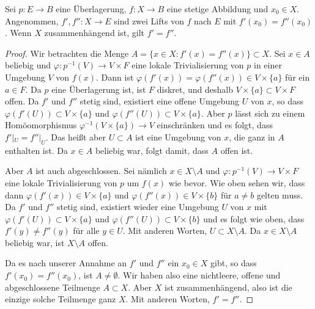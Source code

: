\begin{theorem}\label{thm:lift-uniqueness}
Sei $p\colon E\to B$ eine Überlagerung, $f\colon X\to B$ eine stetige Abbildung und $x_0\in X$. Angenommen, $f',f''\colon X\to E$ sind zwei Lifts von $f$ nach $E$ mit $f'(x_0) = f''(x_0)$. Wenn $X$ zusammenhängend ist, gilt $f' = f''$.
\end{theorem}
\begin{proof}
Wir betrachten die Menge $A = \{x\in X : f'(x) = f''(x)\}\subset X$. Sei $x\in A$ beliebig und $\varphi\colon p^{-1}(V)\to V\times F$ eine lokale Trivialisierung von $p$ in einer Umgebung $V$ von $f(x)$. Dann ist $\varphi(f'(x)) = \varphi(f''(x))\in V\times\{a\}$ für ein $a\in F$. Da $p$ eine Überlagerung ist, ist $F$ diskret, und deshalb $V\times\{a\}\subset V\times F$ offen. Da $f'$ und $f''$ stetig sind, existiert eine offene Umgebung $U$ von $x$, so dass $\varphi(f'(U))\subset V\times\{a\}$ und $\varphi(f''(U))\subset V\times\{a\}$. Aber $p$ lässt sich zu einem Homöomorphismus $\varphi^{-1}(V\times\{a\}) \to V$ einschränken und es folgt, dass $f'|_U = f''|_U$. Das heißt aber $U\subset A$ ist eine Umgebung von $x$, die ganz in $A$ enthalten ist. Da $x\in A$ beliebig war, folgt damit, dass $A$ offen ist.

Aber $A$ ist auch abgeschlossen. Sei nämlich $x\in X\setminus A$ und $\varphi\colon p^{-1}(V)\to V\times F$ eine lokale Trivialisierung von $p$ um $f(x)$ wie bevor. Wie oben sehen wir, dass dann $\varphi(f'(x))\in V\times\{a\}$ und $\varphi(f''(x))\in V\times\{b\}$ für $a\neq b$ gelten muss. Da $f'$ und $f''$ stetig sind, existiert wieder eine Umgebung $U$ von $x$ mit $\varphi(f'(U))\subset V\times\{a\}$ und $\varphi(f''(U))\subset V\times\{b\}$ und es folgt wie oben, dass $f'(y)\neq f''(y)$ für alle $y\in U$. Mit anderen Worten, $U\subset X\setminus A$. Da $x\in X\setminus A$ beliebig war, ist $X\setminus A$ offen.

Da es nach unserer Annahme an $f'$ und $f''$ ein $x_0\in X$ gibt, so dass $f'(x_0) = f''(x_0)$, ist $A\neq \emptyset$. Wir haben also eine nichtleere, offene und abgeschlossene Teilmenge $A\subset X$. Aber $X$ ist zusammenhängend, also ist die einzige solche Teilmenge ganz $X$. Mit anderen Worten, $f' = f''$.
\end{proof}

